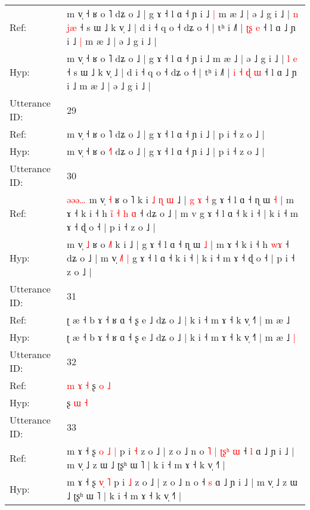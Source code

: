 \documentclass[10pt]{article}
\DeclareRobustCommand{\hl}[1]{{\textcolor{red}{#1}}}
\begin{document}
\begin{longtable}{ll}
Ref: & m v̩ ˧ ʁ o ˥ dʑ o ˩ | g ɤ ˧ l ɑ ˧ ɲ i ˩\hl{ }\hl{|} m æ ˩ | ə ˩ g i ˩ | \hl{n} \hl{j}\hl{æ} ˧ s ɯ ˩ k v̩ ˩ | d i ˧ q o ˧ dʑ o ˧ | tʰ i ˩˥ |\hl{}\hl{} \hl{}\hl{ʈ}\hl{ʂ} \hl{e} ˧ l ɑ ˩ ɲ i ˩\hl{ }\hl{|} m æ ˩ | ə ˩ g i ˩ |
 \\
Hyp: & m v̩ ˧ ʁ o ˥ dʑ o ˩ | g ɤ ˧ l ɑ ˧ ɲ i ˩\hl{}\hl{} m æ ˩ | ə ˩ g i ˩ | \hl{l} \hl{}\hl{e} ˧ s ɯ ˩ k v̩ ˩ | d i ˧ q o ˧ dʑ o ˧ | tʰ i ˩˥ |\hl{ }\hl{i} \hl{˧}\hl{ }\hl{ɖ} \hl{ɯ} ˧ l ɑ ˩ ɲ i ˩\hl{}\hl{} m æ ˩ | ə ˩ g i ˩ |
 \\
\midrule
Utterance ID: & 29 \\
Ref: & m v̩ ˧ ʁ o \hl{}˥ dʑ o ˩ | g ɤ ˧ l ɑ ˧ ɲ i ˩ | p i ˧ z o ˩ |
 \\
Hyp: & m v̩ ˧ ʁ o \hl{˧}˥ dʑ o ˩ | g ɤ ˧ l ɑ ˧ ɲ i ˩ | p i ˧ z o ˩ |
 \\
\midrule
Utterance ID: & 30 \\
Ref: & \hl{ə}\hl{ə}\hl{ə}\hl{…}\hl{ }m v̩ \hl{˧} ʁ o \hl{}˥ k i\hl{ }\hl{˩}\hl{ }\hl{ɳ}\hl{ }\hl{ɯ} ˩ |\hl{ }\hl{g}\hl{ }\hl{ɤ}\hl{ }\hl{˧} g ɤ ˧ l ɑ ˧ ɳ ɯ \hl{˧} | m ɤ ˧ k i ˧ h\hl{ }\hl{i}\hl{̃}\hl{ }\hl{˧} \hl{h}\hl{ }\hl{ɑ} ˧ dʑ o ˩ | m v\hl{}\hl{}\hl{}\hl{}\hl{}\hl{} g ɤ ˧ l ɑ ˧ k i ˧ | k i ˧ m ɤ ˧ ɖ o ˧ | p i ˧ z o ˩ |
 \\
Hyp: & \hl{}\hl{}\hl{}\hl{}\hl{}m v̩ \hl{˩} ʁ o \hl{˩}˥ k i\hl{}\hl{}\hl{}\hl{}\hl{}\hl{} ˩ |\hl{}\hl{}\hl{}\hl{}\hl{}\hl{} g ɤ ˧ l ɑ ˧ ɳ ɯ \hl{˩} | m ɤ ˧ k i ˧ h\hl{}\hl{}\hl{}\hl{}\hl{} \hl{}\hl{w}\hl{ɤ} ˧ dʑ o ˩ | m v\hl{̩}\hl{ }\hl{˩}\hl{˥}\hl{ }\hl{|} g ɤ ˧ l ɑ ˧ k i ˧ | k i ˧ m ɤ ˧ ɖ o ˧ | p i ˧ z o ˩ |
 \\
\midrule
Utterance ID: & 31 \\
Ref: & ʈ æ ˧ b ɤ ˧ ʁ ɑ ˧ ʂ e ˩ dʑ o ˩ | k i ˧ m ɤ ˧ k v̩ ˧˥ | m æ ˩\hl{}\hl{}
 \\
Hyp: & ʈ æ ˧ b ɤ ˧ ʁ ɑ ˧ ʂ e ˩ dʑ o ˩ | k i ˧ m ɤ ˧ k v̩ ˧˥ | m æ ˩\hl{ }\hl{|}
 \\
\midrule
Utterance ID: & 32 \\
Ref: & \hl{m}\hl{ }\hl{ɤ}\hl{ }\hl{˧}\hl{ }ʂ \hl{o} \hl{˩}
 \\
Hyp: & \hl{}\hl{}\hl{}\hl{}\hl{}\hl{}ʂ \hl{ɯ} \hl{˧}
 \\
\midrule
Utterance ID: & 33 \\
Ref: & m ɤ ˧ ʂ \hl{o}\hl{ }\hl{˩} \hl{|} p i \hl{˧} z o ˩ | z o ˩ n o\hl{ }\hl{˥}\hl{ }\hl{|}\hl{ }\hl{ʈ}\hl{ʂ}\hl{ʰ}\hl{ }\hl{ɯ} ˧ \hl{l} ɑ ˩ ɲ i ˩ | m v̩ ˩ z ɯ ˩ ʈʂʰ ɯ ˥ | k i ˧ m ɤ ˧ k v̩ ˧˥ |
 \\
Hyp: & m ɤ ˧ ʂ \hl{}\hl{v}\hl{̩} \hl{˥} p i \hl{˩} z o ˩ | z o ˩ n o\hl{}\hl{}\hl{}\hl{}\hl{}\hl{}\hl{}\hl{}\hl{}\hl{} ˧ \hl{s} ɑ ˩ ɲ i ˩ | m v̩ ˩ z ɯ ˩ ʈʂʰ ɯ ˥ | k i ˧ m ɤ ˧ k v̩ ˧˥ |

\end{longtable}
\end{document}
